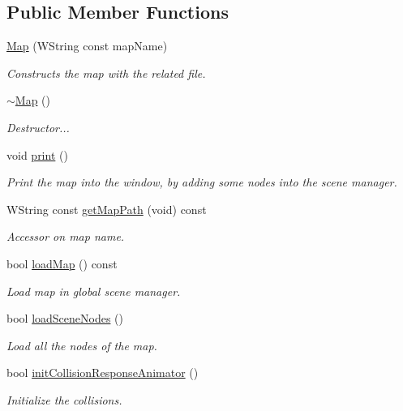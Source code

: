 \subsection*{Public Member Functions}
\begin{DoxyCompactItemize}
\item 
\hyperlink{classMap_a2e6d2bce865999917deae256baaa434d}{Map} (W\+String const map\+Name)
\begin{DoxyCompactList}\small\item\em Constructs the map with the related file. \end{DoxyCompactList}\item 
\mbox{\label{classMap_aa403fbe09394ccf39747588f5168e3b2}} 
\hyperlink{classMap_aa403fbe09394ccf39747588f5168e3b2}{$\sim$\+Map} ()
\begin{DoxyCompactList}\small\item\em Destructor... \end{DoxyCompactList}\item 
\mbox{\label{classMap_a9c6dc88a70dcf25e3371d8bc4ec35ad0}} 
void \hyperlink{classMap_a9c6dc88a70dcf25e3371d8bc4ec35ad0}{print} ()
\begin{DoxyCompactList}\small\item\em Print the map into the window, by adding some nodes into the scene manager. \end{DoxyCompactList}\item 
\mbox{\label{classMap_a47f72d481d0ed624dfd03e63ebd281e5}} 
W\+String const \hyperlink{classMap_a47f72d481d0ed624dfd03e63ebd281e5}{get\+Map\+Path} (void) const
\begin{DoxyCompactList}\small\item\em Accessor on map name. \end{DoxyCompactList}\item 
bool \hyperlink{classMap_ae085956bff7ba817bb82fc37bb8231df}{load\+Map} () const
\begin{DoxyCompactList}\small\item\em Load map in global scene manager. \end{DoxyCompactList}\item 
bool \hyperlink{classMap_a7b66b582699a4ea8108eebd86b1aca57}{load\+Scene\+Nodes} ()
\begin{DoxyCompactList}\small\item\em Load all the nodes of the map. \end{DoxyCompactList}\item 
\mbox{\label{classMap_af7e0fd073da4026f58370b0e5f207e9d}} 
bool \hyperlink{classMap_af7e0fd073da4026f58370b0e5f207e9d}{init\+Collision\+Response\+Animator} ()
\begin{DoxyCompactList}\small\item\em Initialize the collisions. \end{DoxyCompactList}\end{DoxyCompactItemize}


